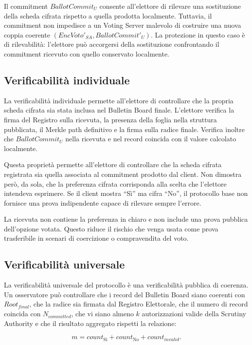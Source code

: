 \documentclass[a4paper,12pt]{article}
\begin{document}
Il commitment \(BallotCommit_U\) consente all'elettore di rilevare una sostituzione della scheda cifrata rispetto a quella prodotta localmente.
Tuttavia, il commitment non impedisce a un Voting Server malevolo di costruire una nuova coppia coerente \((EncVoto'_{SA}, BallotCommit'_U)\).
La protezione in questo caso è di rilevabilità: l'elettore può accorgersi della sostituzione confrontando il commitment ricevuto con quello conservato localmente.

\subsection{Verificabilità individuale}

La verificabilità individuale permette all'elettore di controllare che la propria scheda cifrata sia stata inclusa nel Bulletin Board finale.
L'elettore verifica la firma del Registro sulla ricevuta, la presenza della foglia nella struttura pubblicata, il Merkle path definitivo e la firma sulla radice finale.
Verifica inoltre che \(BallotCommit_U\) nella ricevuta e nel record coincida con il valore calcolato localmente.

Questa proprietà permette all'elettore di controllare che la scheda cifrata registrata sia quella associata al commitment prodotto dal client. Non dimostra però, da sola, che la preferenza cifrata corrisponda alla scelta che l'elettore intendeva esprimere. Se il client mostra ``Sì'' ma cifra ``No'', il protocollo base non fornisce una prova indipendente capace di rilevare sempre l'errore.

La ricevuta non contiene la preferenza in chiaro e non include una prova pubblica dell'opzione votata.
Questo riduce il rischio che venga usata come prova trasferibile in scenari di coercizione o compravendita del voto.

\subsection{Verificabilità universale}

La verificabilità universale del protocollo è una verificabilità pubblica di coerenza.
Un osservatore può controllare che i record del Bulletin Board siano coerenti con \(Root_{final}\), che la radice sia firmata dal Registro Elettorale, che il numero di record coincida con \(N_{committed}\), che vi siano almeno \(k\) autorizzazioni valide della Scrutiny Authority e che il risultato aggregato rispetti la relazione:

\[
    m = count_{\text{Sì}} + count_{\text{No}} + count_{invalid}.
\]
\end{document}

